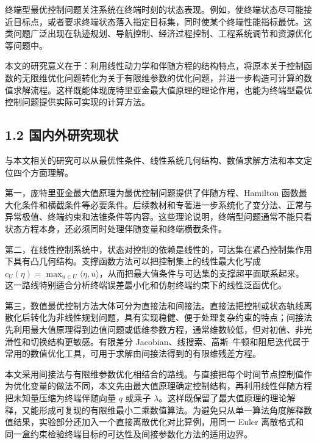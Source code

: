 \documentclass[UTF8,a4paper,zihao=-4]{ctexart}
\begin{document}
终端型最优控制问题关注系统在终端时刻的状态表现。例如，使终端状态尽可能接近目标点，或者要求终端状态落入指定目标集，同时使某个终端性能指标最优。这类问题广泛出现在轨迹规划、导航控制、经济过程控制、工程系统调节和资源优化等问题中。

本文的研究意义在于：利用线性动力学和伴随方程的结构特点，将原本关于控制函数的无限维优化问题转化为关于有限维参数的优化问题，并进一步构造可计算的数值求解流程\cite[第180--190页]{kiselev2007}\cite[第5--7页]{avvakumov1995}。这样既能体现庞特里亚金最大值原理的理论作用，也能为终端型最优控制问题提供实际可实现的计算方法。

\subsection{1.2 国内外研究现状}

与本文相关的研究可以从最优性条件、线性系统几何结构、数值求解方法和本文定位四个方面理解。

第一，庞特里亚金最大值原理为最优控制问题提供了伴随方程、Hamilton 函数最大化条件和横截条件等必要条件\cite[第23--27页]{pontryagin1969}\cite[第336--371页]{lee1972}\cite[第119--158页]{pontryagin1985}。后续教材和专著进一步系统化了变分法、正常与异常极值、终端约束和法锥条件等内容\cite{bryson1975,kirk1970,vinter2000,liberzon2012}。这些理论说明，终端型问题通常不能只看状态方程本身，还必须同时处理伴随变量和终端横截条件。

第二，在线性控制系统中，状态对控制的依赖是线性的，可达集在紧凸控制集作用下具有凸几何结构\cite[第15--59页]{kiselev2007}\cite[第76--91页]{lee1972}。支撑函数方法可以把控制集上的线性最大化写成 $c_U(\eta)=\max_{u\in U}\langle\eta,u\rangle$，从而把最大值条件与可达集的支撑超平面联系起来\cite[第29--37页]{blagodatskikh2001}\cite[第3--4页]{avvakumov1995}。这一路线特别适合分析终端误差最小化和仿射终端约束下的线性泛函优化。

第三，数值最优控制方法大体可分为直接法和间接法。直接法把控制或状态轨线离散化后转化为非线性规划问题，具有实现稳健、便于处理复杂约束的特点\cite{betts2010,rao2009}；间接法先利用最大值原理得到边值问题或低维参数方程，通常维数较低，但对初值、非光滑性和切换结构更敏感\cite[第180--190页]{kiselev2007}\cite[第3--10页]{avvakumov1995}。有限差分 Jacobian、线搜索、高斯--牛顿和阻尼迭代属于常用的数值优化工具\cite{nocedal2006,kelley1999}，可用于求解由间接法得到的有限维残差方程。

本文采用间接法与有限维参数优化相结合的路线。与直接把每个时间节点控制值作为优化变量的做法不同，本文先由最大值原理确定控制结构，再利用线性伴随方程把未知量压缩为终端伴随向量 $q$ 或乘子 $\lambda$。这样既保留了最大值原理的理论解释，又能形成可复现的有限维最小二乘数值算法。为避免只从单一算法角度解释数值结果，实验部分还加入一个直接离散优化对比算例，用同一 Euler 离散格式和同一盒约束检验终端目标的可达性及间接参数化方法的适用边界。
\end{document}
